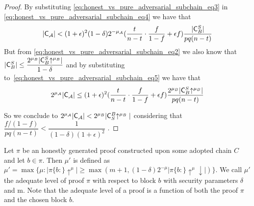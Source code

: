 \begin{proof}
	By substituting \ref{eq:honest_vs_pure_adversarial_subchain_eq3} in \ref{eq:honest_vs_pure_adversarial_subchain_eq4} we have that
	\begin{equation}\label{eq:honest_vs_pure_adversarial_subchain_eq5}
		\lvert \mathsf{C}_\mathcal{A} \rvert < (1+\epsilon)^2(1-\delta)2^{-\mu_\mathcal{A}}( \dfrac{t}{n-t} \cdot \dfrac{f}{1-f} + \epsilon f) \dfrac{\lvert \mathsf{C}^S_B \rvert}{pq(n-t)}
	\end{equation}
	But from \ref{eq:honest_vs_pure_adversarial_subchain_eq2} we also know that $ \lvert \mathsf{C}_{B}^S \rvert \leq \dfrac{2^{\mu_B}\lvert \mathsf{C}_{B}^S \negthickspace\uparrow^{\mu_B} \rvert}{1- \delta}$ and by substituting to~\ref{eq:honest_vs_pure_adversarial_subchain_eq5} we have that 
	\begin{equation}
		2^{\mu_\mathcal{A}} \lvert \mathsf{C}_\mathcal{A} \rvert \leq (1+\epsilon)^2 ( \dfrac{t}{n-t} \cdot \dfrac{f}{1-f} + \epsilon f) \dfrac{2^{\mu_B}\lvert \mathsf{C}^S_B \negthickspace\uparrow^{\mu_B} \rvert}{pq(n-t)}
	\end{equation}

	So we conclude to $2^{\mu_\mathcal{A}} \vert \mathsf{C}_\mathcal{A} \vert
	<  2^{\mu_B} \vert    \mathsf{C}^{B}_{S}\negthickspace\uparrow^{\mu_B}\vert $ considering that $\dfrac{f/(1-f)}{pq(n-t)} < \dfrac{1}{(1-\delta)(1+\epsilon)^2}$ .
\end{proof}

\begin{defn}
	Let $\pi$ be an
	honestly generated proof constructed upon some adopted chain $C$ and let $b \in 
	\pi $. Then $\mu'$ is defined as $\mu' = \max \{ \mu: \vert \pi\{b:\}\uparrow^{\mu}
	\vert \geq \max( m+1, (1-\delta)2^{-\mu} \vert \pi\{b:\}\uparrow^{\mu}\downarrow \vert )\}$.
	We call $\mu'$ the adequate level of proof $\pi$ with respect to block $b$ with
	security parameters $\delta$ and m. Note that the adequate level of a proof is a
	function of both the proof $\pi$ and the chosen block $b$.
\end{defn}



